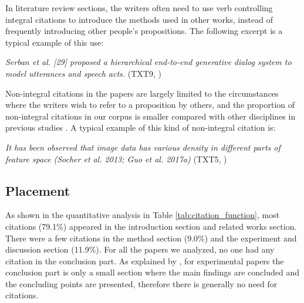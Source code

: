 In literature review sections, the writers often need to use verb controlling integral citations to introduce the methods used in other works, instead of frequently introducing other people’s propositions. The following excerpt is a typical example of this use:

\textit{Serban et al. [29] proposed a hierarchical end-to-end generative dialog system to model utterances and speech acts.} (TXT9, \citealp{li_hierarchical_2018})

Non-integral citations in the papers are largely limited to the circumstances where the writers wish to refer to a proposition by others, and the proportion of non-integral citations in our corpus is smaller compared with other disciplines in previous studies \citep{hyland_academic_1999,samraj_form_2013}. A typical example of this kind of non-integral citation is:

\textit{It has been observed that image data has various density in different parts of feature space (Socher et al. 2013; Guo et al. 2017a)} (TXT5, \citealp{yuchen_dual-view_2019})

\subsection{Placement}
As shown in the quantitative analysis in Table \ref{tab:citation_function}, most citations (79.1\%) appeared in the introduction section and related works section. There were a few citations in the method section (9.0\%) and the experiment and discussion section (11.9\%). For all the papers we analyzed, no one had any citation in the conclusion part. As explained by \citet{mansourizadeh_citation_2011}, for experimental papers the conclusion part is only a small section where the main findings are concluded and the concluding points are presented, therefore there is generally no need for citations.

